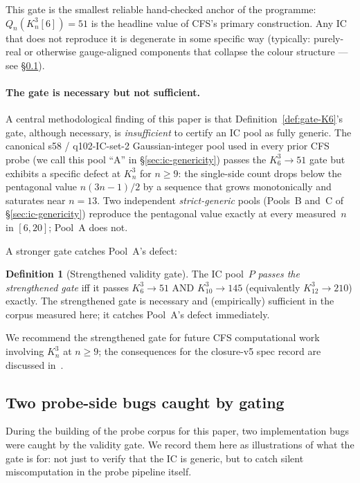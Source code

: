 \documentclass[12pt,a4paper]{article}
\theoremstyle{definition}
\newtheorem{definition}[theorem]{Definition}
\theoremstyle{remark}
\newcommand{\Kn}{K_n^3}
\newcommand{\Qn}{Q_n}
\begin{document}
This gate is the smallest reliable hand-checked anchor of the
programme: $\Qn(\Kn[6]) = 51$ is the headline value of CFS's primary
construction. Any IC that does not reproduce it is degenerate in some
specific way (typically: purely-real or otherwise gauge-aligned
components that collapse the colour structure --- see
\S\ref{sec:methods-bugs}).

\paragraph{The gate is necessary but not sufficient.}
A central methodological finding of this paper is that
Definition~\ref{def:gate-K6}'s gate, although necessary, is
\emph{insufficient} to certify an IC pool as fully generic. The
canonical s58 / q102-IC-set-2 Gaussian-integer pool used in every
prior CFS probe (we call this pool ``A'' in
\S\ref{sec:ic-genericity}) passes the $K_6^3 \to 51$ gate but
exhibits a specific defect at $\Kn$ for $n \ge 9$: the single-side
count drops below the pentagonal value $n(3n{-}1)/2$ by a sequence
that grows monotonically and saturates near $n = 13$. Two
independent \emph{strict-generic} pools (Pools~B and~C of
\S\ref{sec:ic-genericity}) reproduce the pentagonal value
exactly at every measured~$n$ in $[6, 20]$; Pool~A does not.

A stronger gate catches Pool~A's defect:

\begin{definition}[Strengthened validity gate]\label{def:gate-K10}
The IC pool~$P$ \emph{passes the strengthened gate} iff it passes
$K_6^3 \to 51$ AND $K_{10}^3 \to 145$ (equivalently $K_{12}^3 \to 210$)
exactly. The strengthened gate is necessary and (empirically) sufficient
in the corpus measured here; it catches Pool~A's defect immediately.
\end{definition}

We recommend the strengthened gate for future CFS computational work
involving $\Kn$ at $n \ge 9$; the consequences for the closure-v5 spec
record are discussed in~\cite{closure-v5-audit-threebug}.

\subsection{Two probe-side bugs caught by gating}
\label{sec:methods-bugs}

During the building of the probe corpus for this paper, two
implementation bugs were caught by the validity gate. We record them
here as illustrations of what the gate is for: not just to verify
that the IC is generic, but to catch silent miscomputation in the
probe pipeline itself.
\end{document}
